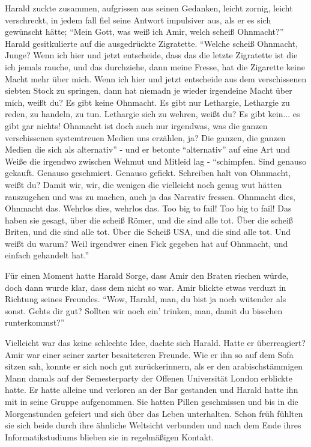 Harald zuckte zusammen, aufgrissen aus seinen Gedanken, leicht zornig, leicht verschreckt, in jedem fall fiel seine Antwort impulsiver aus, als er es sich gewünscht hätte;
``Mein Gott, was weiß ich Amir, welch scheiß Ohnmacht?''
Harald gesitkulierte auf die ausgedrückte Zigratette.
``Welche scheiß Ohnmacht, Junge? Wenn ich hier und jetzt entscheide, dass das die letzte Zigratette ist die ich jemals rauche, und das durchziehe, dann meine Fresse, hat die Zigarette keine Macht mehr über mich. Wenn ich hier und jetzt entscheide aus dem verschissenen siebten Stock zu springen, dann hat niemadn je wieder irgendeine Macht über mich, weißt du? Es gibt keine Ohnmacht. Es gibt nur Lethargie, Lethargie zu reden, zu handeln, zu tun. Lethargie sich zu wehren, weißt du? Es gibt kein... es gibt gar nichts! Ohnmacht ist doch auch nur irgendwas, was die ganzen verschissenen systemtreuen Medien uns erzählen, ja? Die ganzen, die ganzen Medien die sich als alternativ'' - und er betonte ``alternativ'' auf eine Art und Weiße die irgendwo zwischen Wehmut und Mitleid lag - ``schimpfen. Sind genauso gekauft. Genauso geschmiert. Genauso gefickt. Schreiben halt von Ohnmacht, weißt du? Damit wir, wir, die wenigen die vielleicht noch genug wut hätten rauszugehen und was zu machen, auch ja das Narrativ fressen. Ohnmacht dies, Ohnmacht das. Wehrlos dies, wehrlos das. Too big to fail! Too big to fail! Das haben sie gesagt, über die scheiß Römer, und die sind alle tot. Über die scheiß Briten, und die sind alle tot. Über die Scheiß USA, und die sind alle tot. Und weißt du warum? Weil irgendwer einen Fick gegeben hat auf Ohnmacht, und einfach gehandelt hat.''

Für einen Moment hatte Harald Sorge, dass Amir den Braten riechen würde, doch dann wurde klar, dass dem nicht so war. Amir blickte etwas verduzt in Richtung seines Freundes. ``Wow, Harald, man, du bist ja noch wütender als sonst. Gehts dir gut? Sollten wir noch ein' trinken, man, damit du bisschen runterkommst?''

Vielleicht war das keine schlechte Idee, dachte sich Harald. Hatte er überreagiert? Amir war einer seiner zarter besaiteteren Freunde. Wie er ihn so auf dem Sofa sitzen sah, konnte er sich noch gut zurückerinnern, als er den arabischstämmigen Mann damals auf der Semesterparty der Offenen Universität London erblickte hatte. Er hatte alleine und verloren an der Bar gestanden und Harald hatte ihn mit in seine Gruppe aufgenommen. Sie hatten Pillen geschmissen und bis in die Morgenstunden gefeiert und sich über das Leben unterhalten. Schon früh fühlten sie sich beide durch ihre ähnliche Weltsicht verbunden und nach dem Ende ihres Informatikstudiums blieben sie in regelmäßigen Kontakt. 

